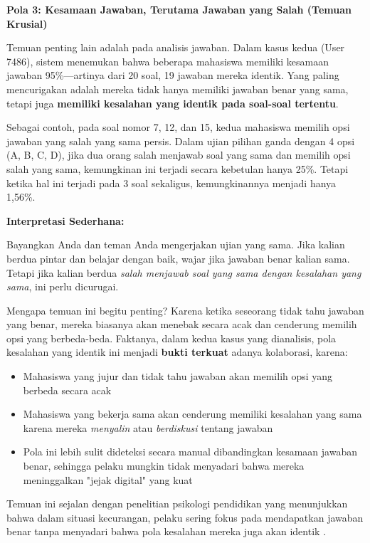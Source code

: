 \textbf{Pola 3: Kesamaan Jawaban, Terutama Jawaban yang Salah (Temuan Krusial)}

Temuan penting lain adalah pada analisis jawaban. Dalam kasus kedua (User 7486), sistem menemukan bahwa beberapa mahasiswa memiliki kesamaan jawaban 95\%—artinya dari 20 soal, 19 jawaban mereka identik. Yang paling mencurigakan adalah mereka tidak hanya memiliki jawaban benar yang sama, tetapi juga \textbf{memiliki kesalahan yang identik pada soal-soal tertentu}.

Sebagai contoh, pada soal nomor 7, 12, dan 15, kedua mahasiswa memilih opsi jawaban yang salah yang sama persis. Dalam ujian pilihan ganda dengan 4 opsi (A, B, C, D), jika dua orang salah menjawab soal yang sama dan memilih opsi salah yang sama, kemungkinan ini terjadi secara kebetulan hanya 25\%. Tetapi ketika hal ini terjadi pada 3 soal sekaligus, kemungkinannya menjadi hanya 1,56\%.

\textbf{Interpretasi Sederhana:}

Bayangkan Anda dan teman Anda mengerjakan ujian yang sama. Jika kalian berdua pintar dan belajar dengan baik, wajar jika jawaban benar kalian sama. Tetapi jika kalian berdua \textit{salah menjawab soal yang sama dengan kesalahan yang sama}, ini perlu dicurugai. 

Mengapa temuan ini begitu penting? Karena ketika seseorang tidak tahu jawaban yang benar, mereka biasanya akan menebak secara acak dan cenderung memilih opsi yang berbeda-beda. Faktanya, dalam kedua kasus yang dianalisis, pola kesalahan yang identik ini menjadi \textbf{bukti terkuat} adanya kolaborasi, karena:

\begin{itemize}
    \item Mahasiswa yang jujur dan tidak tahu jawaban akan memilih opsi yang berbeda secara acak
    \item Mahasiswa yang bekerja sama akan cenderung memiliki kesalahan yang sama karena mereka \textit{menyalin} atau \textit{berdiskusi} tentang jawaban
    \item Pola ini lebih sulit dideteksi secara manual dibandingkan kesamaan jawaban benar, sehingga pelaku mungkin tidak menyadari bahwa mereka meninggalkan "jejak digital" yang kuat
\end{itemize}

Temuan ini sejalan dengan penelitian psikologi pendidikan yang menunjukkan bahwa dalam situasi kecurangan, pelaku sering fokus pada mendapatkan jawaban benar tanpa menyadari bahwa pola kesalahan mereka juga akan identik \citep{Ranger2020}.

